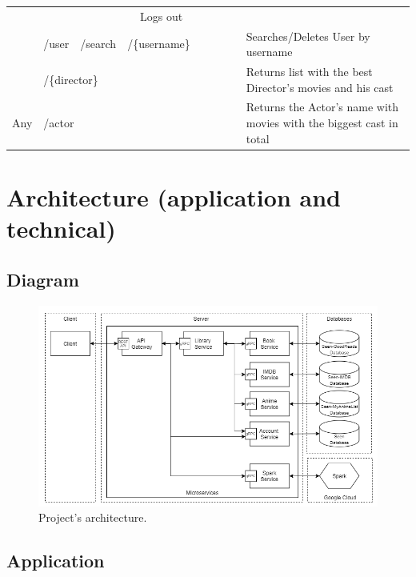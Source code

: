 \documentclass[oneside]{article}
\newcommand{\xmark}{\ding{53}} %
\begin{document}
\begin{table}[H]
\begin{adjustbox}{width=1.6\textwidth}
\begin{tabular}{ c|l l l l|c|c|c|c|l }
    \xmark & & & &
    Logs out
    \\ \rowcolor{Gray}
    \multirow{-2}{*}{Regular} 
    & /user & /search & \multicolumn{2}{l|}{/\{username\}} &
    \xmark & & & \xmark &
    Searches/Deletes User by username
    \\ \hhline{-|----|-|-|-|-|~}
    & \multicolumn{4}{l|}{/\{director\}} &
    \xmark & & & &
    Returns list with the best Director's movies and his cast
    \\ 
    \multirow{-2}{*}{Any}
    & \multicolumn{4}{l|}{/actor} &
    \xmark & & & &
    Returns the Actor's name with movies with the biggest cast in total
  \end{tabular}
  \end{adjustbox}
\end{table}

\section{Architecture (application and technical)}
\label{sec:architecture}
  \subsection{Diagram}
  \begin{figure}[H]
    \centering
    \includegraphics[width=\textwidth]{ CloudNativeAppArchitecture.png }
    \caption{Project's architecture.}
    \label{img:architecture}
  \end{figure}

  \subsection{Application}
\end{document}
